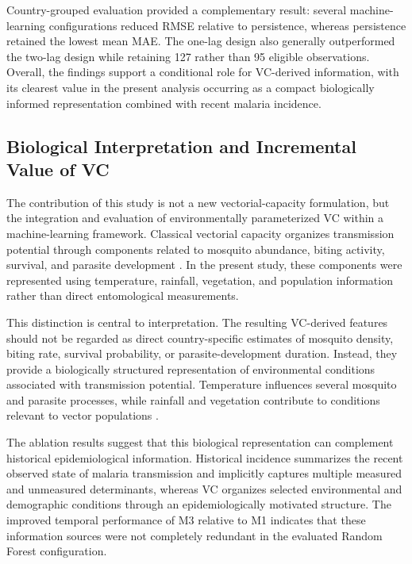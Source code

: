 \documentclass[10pt,twocolumn]{article}
\begin{document}
Country-grouped evaluation provided a complementary result: several
machine-learning configurations reduced RMSE relative to persistence,
whereas persistence retained the lowest mean MAE. The one-lag design
also generally outperformed the two-lag design while retaining 127
rather than 95 eligible observations. Overall, the findings support a
conditional role for VC-derived information, with its clearest value
in the present analysis occurring as a compact biologically informed
representation combined with recent malaria incidence.

\subsection{Biological Interpretation and Incremental Value of VC}

The contribution of this study is not a new vectorial-capacity
formulation, but the integration and evaluation of environmentally
parameterized VC within a machine-learning framework. Classical
vectorial capacity organizes transmission potential through
components related to mosquito abundance, biting activity, survival,
and parasite development
\parencite{Ross1905,Ross1907,LindsayBirley1996}. In the present study,
these components were represented using temperature, rainfall,
vegetation, and population information rather than direct
entomological measurements.

This distinction is central to interpretation. The resulting
VC-derived features should not be regarded as direct country-specific
estimates of mosquito density, biting rate, survival probability, or
parasite-development duration. Instead, they provide a biologically
structured representation of environmental conditions associated with
transmission potential. Temperature influences several mosquito and
parasite processes, while rainfall and vegetation contribute to
conditions relevant to vector populations
\parencite{Villena2022,Dahlin2024}.

The ablation results suggest that this biological representation can
complement historical epidemiological information. Historical
incidence summarizes the recent observed state of malaria transmission
and implicitly captures multiple measured and unmeasured determinants,
whereas VC organizes selected environmental and demographic conditions
through an epidemiologically motivated structure. The improved
temporal performance of M3 relative to M1 indicates that these
information sources were not completely redundant in the evaluated
Random Forest configuration.
\end{document}
